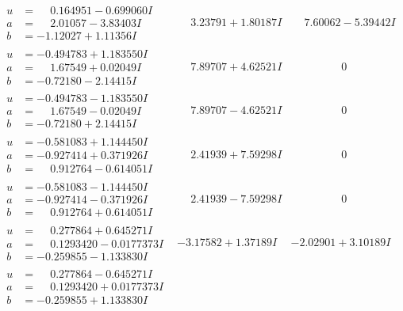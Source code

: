 \documentclass[1p]{elsarticle_modified}
\theoremstyle{definition}
\begin{document}
$$\begin{array}{c|c|c}
\begin{aligned}
u &= \phantom{-}0.164951 - 0.699060 I \\
a &= \phantom{-}2.01057 - 3.83403 I \\
b &= -1.12027 + 1.11356 I\end{aligned}
 & \phantom{-}3.23791 + 1.80187 I & \phantom{-}7.60062 - 5.39442 I \\ \hline\begin{aligned}
u &= -0.494783 + 1.183550 I \\
a &= \phantom{-}1.67549 + 0.02049 I \\
b &= -0.72180 - 2.14415 I\end{aligned}
 & \phantom{-}7.89707 + 4.62521 I & \phantom{-0.000000 } 0 \\ \hline\begin{aligned}
u &= -0.494783 - 1.183550 I \\
a &= \phantom{-}1.67549 - 0.02049 I \\
b &= -0.72180 + 2.14415 I\end{aligned}
 & \phantom{-}7.89707 - 4.62521 I & \phantom{-0.000000 } 0 \\ \hline\begin{aligned}
u &= -0.581083 + 1.144450 I \\
a &= -0.927414 + 0.371926 I \\
b &= \phantom{-}0.912764 - 0.614051 I\end{aligned}
 & \phantom{-}2.41939 + 7.59298 I & \phantom{-0.000000 } 0 \\ \hline\begin{aligned}
u &= -0.581083 - 1.144450 I \\
a &= -0.927414 - 0.371926 I \\
b &= \phantom{-}0.912764 + 0.614051 I\end{aligned}
 & \phantom{-}2.41939 - 7.59298 I & \phantom{-0.000000 } 0 \\ \hline\begin{aligned}
u &= \phantom{-}0.277864 + 0.645271 I \\
a &= \phantom{-}0.1293420 - 0.0177373 I \\
b &= -0.259855 - 1.133830 I\end{aligned}
 & -3.17582 + 1.37189 I & -2.02901 + 3.10189 I \\ \hline\begin{aligned}
u &= \phantom{-}0.277864 - 0.645271 I \\
a &= \phantom{-}0.1293420 + 0.0177373 I \\
b &= -0.259855 + 1.133830 I\end{aligned}

\end{array}$$
\end{document}
